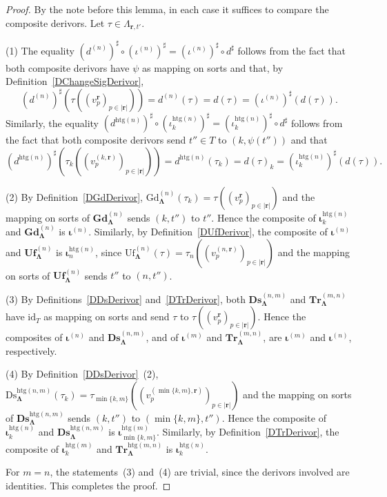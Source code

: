 \documentclass[a4paper, reqno]{amsbook}
\newcommand{\bb}[1]{\ensuremath{\lvert #1 \rvert}}
\newcommand{\sig}[1]{\mathbf{#1}}             %
\newcommand{\htg}{\mathrm{htg}}                %
\newcommand{\id}{\mathrm{id}}
\newcommand{\Gd}{\mathrm{Gd}}
\newcommand{\Uf}{\mathrm{Uf}}
\newcommand{\Ds}{\mathrm{Ds}}
\newcommand{\bGd}{\mathbf{Gd}}
\newcommand{\bUf}{\mathbf{Uf}}
\newcommand{\bDs}{\mathbf{Ds}}
\newcommand{\bTr}{\mathbf{Tr}}
\theoremstyle{plain}
\theoremstyle{definition}
\begin{document}
\begin{proof}
By the note before this lemma, in each case it suffices to compare the composite derivors.
Let $\tau\in\Lambda_{\mathbf{r},t'}$.

(1) The equality $(d^{(n)})^{\sharp}\circ(\iota^{(n)})^{\sharp}=(\iota^{(n)})^{\sharp}\circ d^{\sharp}$ follows from the fact that both composite derivors have $\psi$ as mapping on sorts and that, by Definition~\ref{DChangeSigDerivor},
$$
(d^{(n)})^{\sharp}\left(\tau\left((v^{\mathbf{r}}_{p})_{p\in\bb{\mathbf{r}}}\right)\right)=d^{(n)}(\tau)=d(\tau)=(\iota^{(n)})^{\sharp}(d(\tau)).
$$
Similarly, the equality $(d^{\htg(n)})^{\sharp}\circ(\iota^{\htg(n)}_{k})^{\sharp}=(\iota^{\htg(n)}_{k})^{\sharp}\circ d^{\sharp}$ follows from the fact that both composite derivors send $t''\in T$ to $(k,\psi(t''))$ and that
$$
(d^{\htg(n)})^{\sharp}\left(\tau_{k}\left((v^{(k,\mathbf{r})}_{p})_{p\in\bb{\mathbf{r}}}\right)\right)=d^{\htg(n)}(\tau_{k})=d(\tau)_{k}=(\iota^{\htg(n)}_{k})^{\sharp}(d(\tau)).
$$

(2) By Definition~\ref{DGdDerivor}, $\Gd^{(n)}_{\sig{\Lambda}}(\tau_{k})=\tau((v^{\mathbf{r}}_{p})_{p\in\bb{\mathbf{r}}})$ and the mapping on sorts of $\bGd^{(n)}_{\sig{\Lambda}}$ sends $(k,t'')$ to $t''$.
Hence the composite of $\boldsymbol{\iota}^{\htg(n)}_{k}$ and $\bGd^{(n)}_{\sig{\Lambda}}$ is $\boldsymbol{\iota}^{(n)}$.
Similarly, by Definition~\ref{DUfDerivor}, the composite of $\boldsymbol{\iota}^{(n)}$ and $\bUf^{(n)}_{\sig{\Lambda}}$ is $\boldsymbol{\iota}^{\htg(n)}_{n}$, since $\Uf^{(n)}_{\sig{\Lambda}}(\tau)=\tau_{n}((v^{(n,\mathbf{r})}_{p})_{p\in\bb{\mathbf{r}}})$ and the mapping on sorts of $\bUf^{(n)}_{\sig{\Lambda}}$ sends $t''$ to $(n,t'')$.

(3) By Definitions~\ref{DDsDerivor} and~\ref{DTrDerivor}, both $\bDs^{(n,m)}_{\sig{\Lambda}}$ and $\bTr^{(m,n)}_{\sig{\Lambda}}$ have $\id_{T}$ as mapping on sorts and send $\tau$ to $\tau((v^{\mathbf{r}}_{p})_{p\in\bb{\mathbf{r}}})$.
Hence the composites of $\boldsymbol{\iota}^{(n)}$ and $\bDs^{(n,m)}_{\sig{\Lambda}}$, and of $\boldsymbol{\iota}^{(m)}$ and $\bTr^{(m,n)}_{\sig{\Lambda}}$, are $\boldsymbol{\iota}^{(m)}$ and $\boldsymbol{\iota}^{(n)}$, respectively.

(4) By Definition~\ref{DDsDerivor}~(2), $\Ds^{\htg(n,m)}_{\sig{\Lambda}}(\tau_{k})=\tau_{\min\{k,m\}}((v^{(\min\{k,m\},\mathbf{r})}_{p})_{p\in\bb{\mathbf{r}}})$ and the mapping on sorts of $\bDs^{\htg(n,m)}_{\sig{\Lambda}}$ sends $(k,t'')$ to $(\min\{k,m\},t'')$.
Hence the composite of $\boldsymbol{\iota}^{\htg(n)}_{k}$ and $\bDs^{\htg(n,m)}_{\sig{\Lambda}}$ is $\boldsymbol{\iota}^{\htg(m)}_{\min\{k,m\}}$.
Similarly, by Definition~\ref{DTrDerivor}, the composite of $\boldsymbol{\iota}^{\htg(m)}_{k}$ and $\bTr^{\htg(m,n)}_{\sig{\Lambda}}$ is $\boldsymbol{\iota}^{\htg(n)}_{k}$.

For $m=n$, the statements~(3) and~(4) are trivial, since the derivors involved are identities. This completes the proof.
\end{proof}
\end{document}

